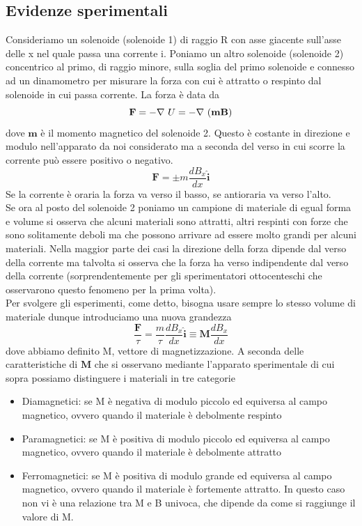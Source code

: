 \documentclass[
10pt, %
a4paper, %
oneside, %
headinclude,footinclude, %
BCOR5mm, %
]{scrartcl}
\begin{document}
\subsection{Evidenze sperimentali}
Consideriamo un solenoide (solenoide 1) di raggio R con asse giacente sull'asse delle x nel quale passa una corrente i. Poniamo un altro solenoide (solenoide 2) concentrico al primo, di raggio minore, sulla soglia del primo solenoide e connesso ad un dinamometro per misurare la forza con cui è attratto o respinto dal solenoide in cui passa corrente. La forza è data da 
\[\mathbf{F} = -\nabla\  U = -\nabla\ (\mathbf{m}\mathbf{B})\]
dove \(\mathbf{m}\) è il momento magnetico del solenoide 2. Questo è costante in direzione e modulo nell'apparato da noi considerato ma a seconda del verso in cui scorre la corrente può essere positivo o negativo.
\[\mathbf{F}=\pm m \frac{d B_x}{dx}\mathbf{\hat{i}}\]
Se la corrente è oraria la forza va verso il basso, se antioraria va verso l'alto.\\
Se ora al posto del solenoide 2 poniamo un campione di materiale di egual forma e volume si osserva che alcuni materiali sono attratti, altri respinti con forze che sono solitamente deboli ma che possono arrivare ad essere molto grandi per alcuni materiali. Nella maggior parte dei casi la direzione della forza dipende dal verso della corrente ma talvolta si osserva che la forza ha verso indipendente dal verso della corrente (sorprendentemente per gli sperimentatori ottocenteschi che osservarono questo fenomeno per la prima volta).\\
Per svolgere gli esperimenti, come detto, bisogna usare sempre lo stesso volume di materiale dunque introduciamo una nuova grandezza
\[\frac{\mathbf{F}}{\tau} = \frac{m}{\tau}\frac{d B_x}{dx}\mathbf{\hat{i}}\equiv \mathbf{M}\frac{dB_x}{dx}\]
dove abbiamo definito M, vettore di magnetizzazione. A seconda delle caratteristiche di \(\mathbf{M}\) che si osservano mediante l'apparato sperimentale di cui sopra possiamo distinguere i materiali in tre categorie
\begin{itemize}
	\item Diamagnetici: se M è negativa di modulo piccolo ed equiversa al campo magnetico, ovvero quando il materiale è debolmente respinto
	\item Paramagnetici: se M è positiva di modulo piccolo ed equiversa al campo magnetico, ovvero quando il materiale è debolmente attratto
	\item Ferromagnetici: se M è positiva di modulo grande ed equiversa al campo magnetico, ovvero quando il materiale è fortemente attratto. In questo caso non vi è una relazione tra M e B univoca, che dipende da come si raggiunge il valore di M. 
\end{itemize}
\end{document}
